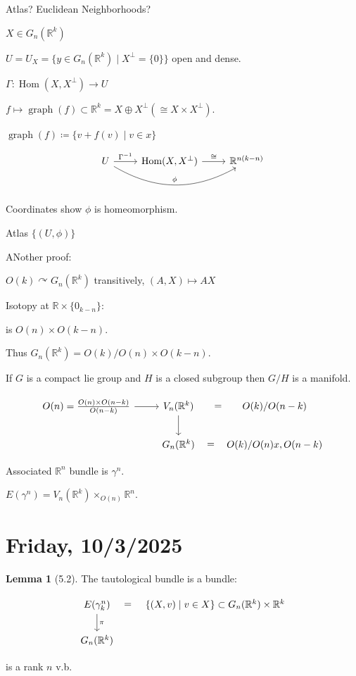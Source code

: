 \documentclass{article}
\theoremstyle{definition}
\newtheorem{lemma}[theorem]{Lemma}
\begin{document}
    Atlas? Euclidean Neighborhoods?

    \(X \in G_n(\mathbb{R}^k)\)

    \(U = U_X = \{ y\in G_n(\mathbb{R}^k) \mid X^{\perp}  = \{ 0 \} \} \) open and dense.

    \(\Gamma : \operatorname{Hom} (X, X^{\perp}) \to U\)
    
    \(f \mapsto \operatorname{graph}(f) \subset \mathbb{R}^k = X \oplus X^{\perp } (\cong X \times X^{\perp})\).

    \(\operatorname{graph}(f) \coloneqq \{v + f(v) \mid v\in x\} \) 

    \[
        \begin{tikzcd}
            U \ar[r, "\Gamma^{-1}"] \ar[rr, bend right, "\phi"] & \operatorname{Hom} (X, X^{\perp}) \ar[r, "\cong"] & \mathbb{R}^{n(k-n)}
        \end{tikzcd}
    \]

    Coordinates show \(\phi\) is homeomorphism.

    Atlas \(\{ (U, \phi) \} \) 

    ANother proof:

    \(O(k) \curvearrowright G_n(\mathbb{R}^k)\) transitively, \((A,X) \mapsto AX\) 

    Isotopy at \(\mathbb{R} \times \{ 0_{k-n} \} \):

    is \(O(n) \times O(k-n)\).

    Thus \(G_n(\mathbb{R}^k) = O(k) / O(n) \times O(k-n)\).

    If \(G\) is a compact lie group and \(H\) is a closed subgroup then \(G / H\) is a manifold.

    \[
        \begin{tikzcd}
            O(n) = \frac{O(n) \times O(n-k)}{O(n-k)} \ar[r] & V_n(\mathbb{R}^k) \ar[d] \ar[r,"=", phantom] & O(k)/O(n-k)  \\
            & G_n(\mathbb{R}^k) \ar[r,"=",phantom] & O(k) / O(n) x,O(n-k)
        \end{tikzcd}
    \]

    Associated \(\mathbb{R}^n\) bundle is \(\gamma^n\).

    \(E(\gamma^n) = V_n(\mathbb{R}^k) \times_{O(n)} \mathbb{R}^n\).
    
    \section*{Friday, 10/3/2025}
    
    \begin{lemma}
        [5.2] The tautological bundle is a bundle:

        \[
            \begin{tikzcd}
                E(\gamma^n_k) \ar[r, phantom, "="] \ar[d,"\pi"] & \{ (X,v) \mid v\in X \} \subset G_n(\mathbb{R}^k) \times \mathbb{R}^k \\
                G_n(\mathbb{R}^k)
            \end{tikzcd}
        \]

        is a rank \(n\) v.b.
    \end{lemma}
\end{document}
